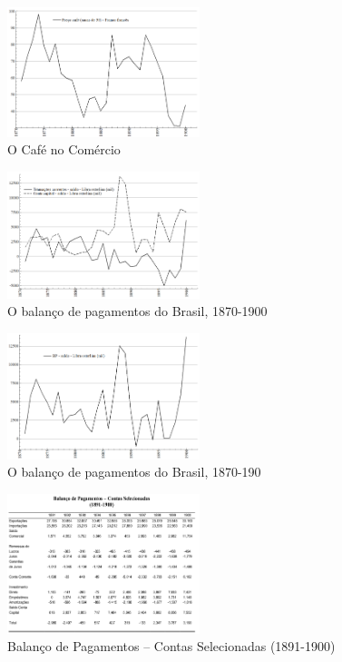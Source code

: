 \documentclass[a4paper,12pt]{article}[abntex2]
\begin{document}
\begin{figure}[H]
    \centering
    \includegraphics[width=0.5\textwidth]{Imagens Slides/i2a10.png}
    \caption{O Café no Comércio}
\end{figure}

\begin{figure}[H]
    \centering
    \includegraphics[width=0.5\textwidth]{Imagens Slides/i3a10.png}
    \caption{O balanço de pagamentos do Brasil, 1870-1900}
\end{figure}

\begin{figure}[H]
    \centering
    \includegraphics[width=0.5\textwidth]{Imagens Slides/i4a10.png}
    \caption{O balanço de pagamentos do Brasil, 1870-190}
\end{figure}

\begin{figure}[H]
    \centering
    \includegraphics[width=0.5\textwidth]{Imagens Slides/i5a10.png}
    \caption{Balanço de Pagamentos – Contas Selecionadas (1891-1900)}
\end{figure}
\end{document}
